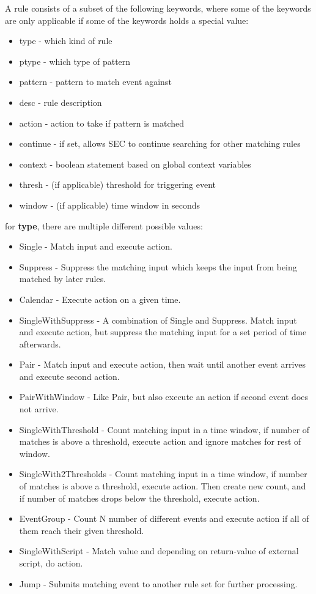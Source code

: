 A rule consists of a subset of the following keywords, where some of the keywords are only applicable if some of the keywords holds a special value:
\begin{itemize}
    \item type - which kind of rule
    \item ptype - which type of pattern
    \item pattern - pattern to match event against
    \item desc - rule description
    \item action - action to take if pattern is matched
    \item continue - if set, allows SEC to continue searching for other matching rules
    \item context - boolean statement based on global context variables
    \item thresh - (if applicable) threshold for triggering event
    \item window - (if applicable) time window in seconds
\end{itemize}

for \textbf{type}, there are multiple different possible values:
\begin{itemize}
    \item Single - Match input and execute action.
    \item Suppress - Suppress the matching input which keeps the input from being matched by later rules.
    \item Calendar - Execute action on a given time.
    \item SingleWithSuppress - A combination of Single and Suppress. Match input and execute action, but suppress the matching input for a set period of time afterwards.
    \item Pair - Match input and execute action, then wait until another event arrives and execute second action.
    \item PairWithWindow - Like Pair, but also execute an action if second event does not arrive.
    \item SingleWithThreshold - Count matching input in a time window, if number of matches is above a threshold, execute action and ignore matches for rest of window.
    \item SingleWith2Thresholds - Count matching input in a time window, if number of matches is above a threshold, execute action. Then create new count, and if number of matches drops below the threshold, execute action. 
    \item EventGroup - Count N number of different events and execute action if all of them reach their given threshold.
    \item SingleWithScript - Match value and depending on return-value of external script, do action.
    \item Jump - Submits matching event to another rule set for further processing.
\end{itemize}

